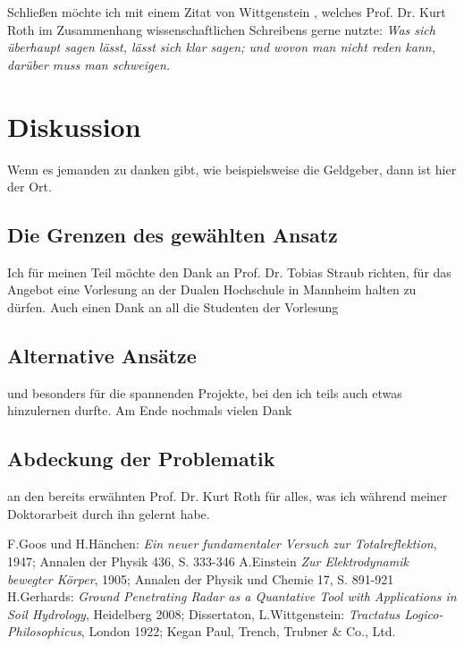 \documentclass[10pt,twocolumn]{scrartcl}
\begin{document}
Schließen möchte ich mit einem Zitat von Wittgenstein \cite{Wittgenstein1922},
welches Prof. Dr. Kurt Roth im Zusammenhang wissenschaftlichen
Schreibens gerne nutzte: {\it Was sich überhaupt sagen lässt, lässt
sich klar sagen; und wovon man nicht reden kann, darüber muss man
schweigen.} 

\section{Diskussion}

Wenn es jemanden zu danken gibt, wie beispielsweise die Geldgeber, 
dann ist hier der Ort.

\subsection{Die Grenzen des gewählten Ansatz}

Ich für meinen Teil möchte den Dank an Prof. Dr. Tobias Straub
richten, für das Angebot eine Vorlesung an der Dualen Hochschule in
Mannheim halten zu dürfen. Auch einen Dank an all die Studenten der Vorlesung

\subsection{Alternative Ansätze}

und besonders für die spannenden Projekte, bei den ich teils auch 
etwas hinzulernen durfte. Am Ende nochmals vielen Dank 

\subsection{Abdeckung der Problematik}

an den bereits erwähnten Prof. Dr. Kurt Roth für alles, 
was ich während meiner Doktorarbeit durch ihn gelernt habe.

\begin{thebibliography}{99}
F.Goos und H.Hänchen: {\it Ein neuer fundamentaler Versuch zur Totalreflektion}, 1947; Annalen der Physik 436, S. 333-346
A.Einstein {\it Zur Elektrodynamik bewegter Körper}, 1905; Annalen der Physik und Chemie 17, S. 891-921
H.Gerhards: {\it Ground Penetrating Radar as a Quantative Tool with Applications in Soil Hydrology}, Heidelberg 2008; Dissertaton,
L.Wittgenstein: {\it Tractatus Logico-Philo\-so\-phi\-cus}, London 1922; Kegan Paul, Trench, Trubner \& Co., Ltd.
\end{thebibliography}
\end{document}
